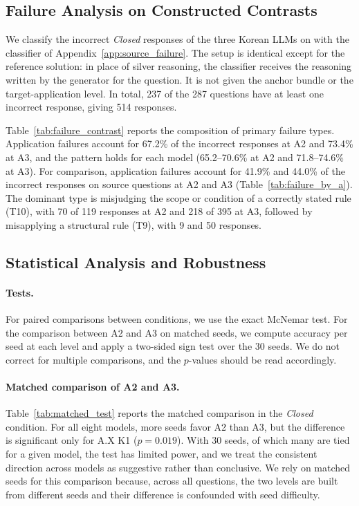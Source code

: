 

\subsection{Failure Analysis on Constructed Contrasts}

We classify the incorrect \textit{Closed} responses of the three Korean LLMs on \name{} with the classifier of Appendix~\ref{app:source_failure}.
The setup is identical except for the reference solution: in place of silver reasoning, the classifier receives the reasoning written by the generator for the question.
It is not given the anchor bundle or the target-application level.
In total, 237 of the 287 questions have at least one incorrect response, giving 514 responses.

Table~\ref{tab:failure_contrast} reports the composition of primary failure types.
Application failures account for 67.2\% of the incorrect responses at A2 and 73.4\% at A3, and the pattern holds for each model (65.2--70.6\% at A2 and 71.8--74.6\% at A3).
For comparison, application failures account for 41.9\% and 44.0\% of the incorrect responses on source questions at A2 and A3 (Table~\ref{tab:failure_by_a}).
The dominant type is misjudging the scope or condition of a correctly stated rule (T10), with 70 of 119 responses at A2 and 218 of 395 at A3, followed by misapplying a structural rule (T9), with 9 and 50 responses.



\subsection{Statistical Analysis and Robustness}

\paragraph{Tests.}
For paired comparisons between conditions, we use the exact McNemar test.
For the comparison between A2 and A3 on matched seeds, we compute accuracy per seed at each level and apply a two-sided sign test over the 30 seeds.
We do not correct for multiple comparisons, and the $p$-values should be read accordingly.

\paragraph{Matched comparison of A2 and A3.}
Table~\ref{tab:matched_test} reports the matched comparison in the \textit{Closed} condition.
For all eight models, more seeds favor A2 than A3, but the difference is significant only for A.X K1 ($p = 0.019$).
With 30 seeds, of which many are tied for a given model, the test has limited power, and we treat the consistent direction across models as suggestive rather than conclusive.
We rely on matched seeds for this comparison because, across all questions, the two levels are built from different seeds and their difference is confounded with seed difficulty.

